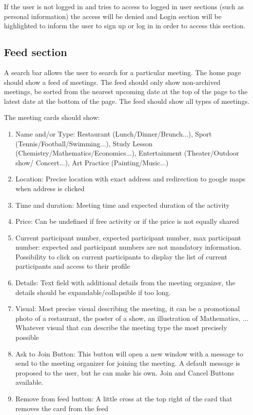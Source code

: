 \documentclass[conference]{IEEEtran}
\begin{document}
If the user is not logged in and tries to access to logged in user sections (such as personal information) the access will be denied and Login section will be highlighted to inform the user to sign up or log in in order to access this section.


\subsection{Feed section}

A search bar allows the user to search for a particular meeting.
The home page should show a feed of meetings. The feed should only show non-archived meetings, be sorted from the nearest upcoming date at the top of the page to the latest date at the bottom of the page. The feed should show all types of meetings.

The meeting cards should show:

\begin{enumerate}
\item Name and/or Type: Restaurant
(Lunch/Dinner/Brunch...), Sport (Tennis/Football/Swimming...), Study Lesson (Chemistry/Mathematics/Economics...), Entertainment (Theater/Outdoor show/ Concert...), Art Practice (Painting/Music...)
\item Location: Precise location with exact address and redirection to google maps when address is clicked
\item Time and duration: Meeting time and expected duration
of the activity
\item Price: Can be undefined if free activity or if the price is
not equally shared
\item Current participant number, expected participant
number, max participant number: expected and participant numbers are not mandatory information.
Possibility to click on current participants to display the
list of current participants and access to their profile
\item Details: Text field with additional details from the meeting organizer, the details should be
expandable/collapsible if too long.
\item Visual: Most precise visual describing the meeting, it can
be a promotional photo of a restaurant, the poster of a show, an illustration of Mathematics, ... Whatever visual that can describe the meeting type the most precisely possible
\item Ask to Join Button: This button will open a new window with a message to send to the meeting organizer for joining the meeting. A default message is proposed to the user, but he can make his own. Join and Cancel Buttons available.
\item Remove from feed button: A little cross at the top right of the card that removes the card from the feed
\end{enumerate}
\end{document}
